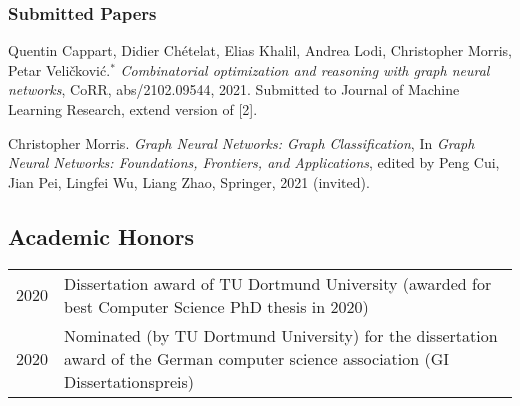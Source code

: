 \documentclass[11pt, a4paper, DIV=12]{scrartcl}
\begin{document}
\begin{thebibliography}{5}
\subsubsection*{Submitted Papers}

Quentin Cappart, Didier Chételat, Elias Khalil, Andrea Lodi, Christopher Morris, Petar Veli\v{c}kovi\'{c}.$^*$
\emph{Combinatorial optimization and reasoning with graph neural networks},
CoRR, abs/2102.09544, 2021. Submitted to Journal of Machine Learning Research, extend version of [2].


Christopher Morris.
\emph{Graph Neural Networks: Graph Classification},
In \emph{Graph Neural Networks: Foundations, Frontiers, and Applications}, edited by Peng Cui, Jian Pei, Lingfei Wu, Liang Zhao, Springer, 2021 (invited).	
	
\end{thebibliography}

\subsection*{Academic Honors}
\begin{tabular}{p{2.1cm}p{12.0cm}}
	2020& Dissertation award of TU Dortmund University (awarded for best Computer Science PhD thesis in 2020)\\
	2020& Nominated (by TU Dortmund University) for the dissertation award of the German computer science association (GI Dissertationspreis)\\
\end{tabular}
\end{document}
